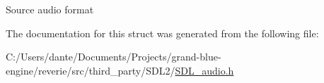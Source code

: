 Source audio format 

The documentation for this struct was generated from the following file\+:\begin{DoxyCompactItemize}
\item 
C\+:/\+Users/dante/\+Documents/\+Projects/grand-\/blue-\/engine/reverie/src/third\+\_\+party/\+S\+D\+L2/\mbox{\hyperlink{_s_d_l__audio_8h}{S\+D\+L\+\_\+audio.\+h}}\end{DoxyCompactItemize}
